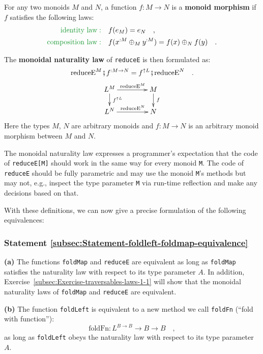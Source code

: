 For any two monoids $M$ and $N$, a function $f:M\rightarrow N$
is a \textbf{monoid morphism} if $f$
satisfies the following laws:
\begin{align*}
{\color{greenunder}\text{identity law}:}\quad & f(e_{M})=e_{N}\quad,\\
{\color{greenunder}\text{composition law}:}\quad & f(x^{:M}\oplus_{M}y^{:M})=f(x)\oplus_{N}f(y)\quad.
\end{align*}

The \textbf{monoidal naturality law} of
\lstinline!reduceE! is then formulated as:
\begin{equation}
\text{reduceE}^{M}\bef f^{:M\rightarrow N}=f^{\uparrow L}\bef\text{reduceE}^{N}\quad.\label{eq:monoidal-naturality-law-of-reduceE}
\end{equation}
\[
\xymatrix{\xyScaleY{1.4pc}\xyScaleX{3.5pc}L^{M}\ar[r]\sp(0.5){\ \text{reduceE}^{M}}\ar[d]\sp(0.45){\,f^{\uparrow L}} & M\ar[d]\sp(0.45){\,f}\\
L^{N}\ar[r]\sp(0.5){~\text{reduceE}^{N}} & N
}
\]
Here the types $M$, $N$ are arbitrary monoids and $f:M\rightarrow N$
is an arbitrary monoid morphism between $M$ and $N$. 

The monoidal naturality law expresses a programmer\textsf{'}s expectation that
the code of \lstinline!reduceE[M]! should work in the same way for
every monoid \lstinline!M!. The code of \lstinline!reduceE! should
be fully parametric and may use the monoid \lstinline!M!\textsf{'}s methods
but may not, e.g., inspect the type parameter \lstinline!M! via run-time
reflection and make any decisions based on that. 

With these definitions, we can now give a precise formulation of the
following equivalences:

\subsubsection{Statement \label{subsec:Statement-foldleft-foldmap-equivalence}\ref{subsec:Statement-foldleft-foldmap-equivalence}}

\textbf{(a)} The functions \lstinline!foldMap! and \lstinline!reduceE!
are equivalent as long as \lstinline!foldMap! satisfies the naturality
law with respect to its type parameter $A$. In addition, Exercise~\ref{subsec:Exercise-traversables-laws-1-1}
will show that the monoidal naturality laws of \lstinline!foldMap!
and \lstinline!reduceE! are equivalent.

\textbf{(b)} The function \lstinline!foldLeft! is equivalent to a
new method we call \lstinline!foldFn! (\textsf{``}fold with function\textsf{''}):
\[
\text{foldFn}:L^{B\rightarrow B}\rightarrow B\rightarrow B\quad,
\]
as long as \lstinline!foldLeft! obeys the naturality law with respect
to its type parameter $A$.

